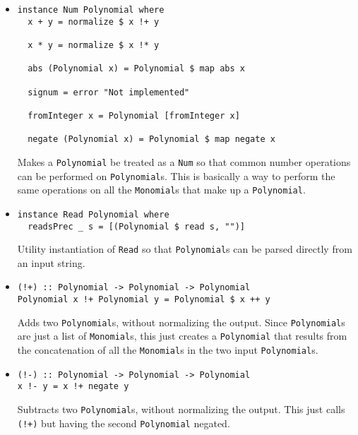 \documentclass[11pt,a4paper]{article}
\begin{document}
\begin{itemize}
    \item \begin{lstlisting}
instance Num Polynomial where
  x + y = normalize $ x !+ y

  x * y = normalize $ x !* y

  abs (Polynomial x) = Polynomial $ map abs x

  signum = error "Not implemented"

  fromInteger x = Polynomial [fromInteger x]

  negate (Polynomial x) = Polynomial $ map negate x
    \end{lstlisting}

          Makes a \lstinline{Polynomial} be treated as a \lstinline{Num} so that common number operations can be performed on \lstinline{Polynomial}s. This is basically a way to perform the same operations on all the \lstinline{Monomial}s that make up a \lstinline{Polynomial}.

    \item \begin{lstlisting}
instance Read Polynomial where
  readsPrec _ s = [(Polynomial $ read s, "")]
    \end{lstlisting}

          Utility instantiation of \lstinline{Read} so that \lstinline{Polynomial}s can be parsed directly from an input string.

    \item \begin{lstlisting}
(!+) :: Polynomial -> Polynomial -> Polynomial
Polynomial x !+ Polynomial y = Polynomial $ x ++ y
    \end{lstlisting}

          Adds two \lstinline{Polynomial}s, without normalizing the output. Since \lstinline{Polynomial}s are just a list of \lstinline{Monomial}s, this just creates a \lstinline{Polynomial} that results from the concatenation of all the \lstinline{Monomial}s in the two input \lstinline{Polynomial}s.

    \item \begin{lstlisting}
(!-) :: Polynomial -> Polynomial -> Polynomial
x !- y = x !+ negate y
    \end{lstlisting}

          Subtracts two \lstinline{Polynomial}s, without normalizing the output. This just calls \lstinline{(!+)} but having the second \lstinline{Polynomial} negated.


\end{itemize}
\end{document}
